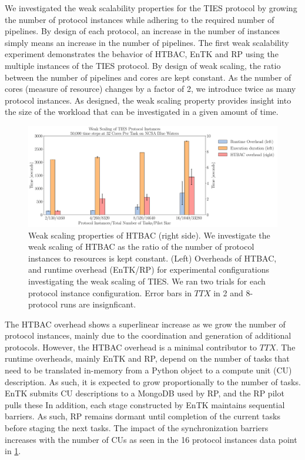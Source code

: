 We investigated the weak scalability properties for the TIES protocol by
growing the number of protocol instances while adhering to the required number
of pipelines. By design of each protocol, an increase in the number of
instances simply means an increase in the number of pipelines. The first weak
scalability experiment demonstrates the behavior of HTBAC, EnTK and RP using
the multiple instances of the TIES protocol. By design of weak scaling, the
ratio between the number of pipelines and cores are kept constant. As the
number of cores (measure of resource) changes by a factor of 2, we introduce
twice as many protocol instances. As designed, the weak scaling property
provides insight into the size of the workload that can be investigated in a
given amount of time.

\begin{figure}
  \centering
   \includegraphics[width=\columnwidth]{./figures/weak_scaling_TIES_instances_50,000_timesteps_with_16_instances.pdf}
  \caption{Weak scaling properties of HTBAC (right side). We investigate the
  weak scaling of HTBAC as the ratio of the number of protocol instances to
  resources is kept constant. (Left) Overheads of HTBAC, and runtime overhead (EnTK/RP) for
  experimental configurations investigating the weak scaling of TIES. We ran two trials for each protocol instance configuration. Error bars in \(TTX\) in 2 and 8-protocol runs are insignficant.}
\label{fig:weak_scaling}
\end{figure}

The HTBAC overhead shows a superlinear increase as we grow the number of protocol 
instances, mainly due to the coordination and generation of additional protocols.
However, the HTBAC overhead is a minimal contributor to \(TTX\). 
The runtime overheads, mainly EnTK and RP, depend on the number of tasks that need to 
be translated in-memory from a Python object to a compute unit (CU) description.
As such, it is expected to grow proportionally to the number of tasks. EnTK
submits CU descriptions to a MongoDB used by RP, and the RP pilot pulls these
In addition, each stage constructed by EnTK maintains sequential barriers. As
such, RP remains dormant until completion of the current tasks before staging
the next tasks. The impact of the synchronization barriers increases with the
number of CUs as seen in the 16 protocol instances data point in
\ref{fig:weak_scaling}.

